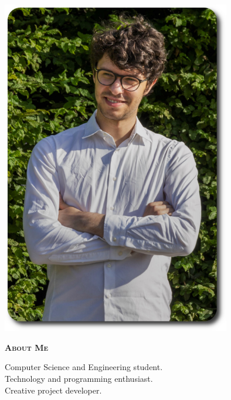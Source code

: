 \documentclass[11pt, a4paper]{article}
\newcommand{\leftsection}[1]{\vspace*{2ex}\textsc{\textbf{#1}}\par%
\vspace*{-1.5ex}\hrulefill\par\vspace*{0.7ex}}
\begin{document}
\setlength{\topskip}{0pt}
\setlength{\parindent}{0pt}
\setlength{\parskip}{0pt}
\setlength{\fboxsep}{0pt}
\pagestyle{empty}
\raggedbottom

\begin{minipage}[t]{0.30\textwidth} %

  \colorbox{cvblue}{
    \color{white}  %
    \hspace{1em}  %
    \begin{minipage}[t][\textheight][t]{0.82\textwidth}
      \raggedright
      \vspace*{2.5ex}

      \null\hfill\includegraphics[width=0.75\textwidth]{images/photo.png}\hfill\null

      \vspace*{0.5ex} %

      \leftsection{About Me}
      Computer Science and Engineering student. \\
      Technology and programming enthusiast. \\
      Creative project developer. \\


\end{minipage}}
\end{minipage}
\end{document}
